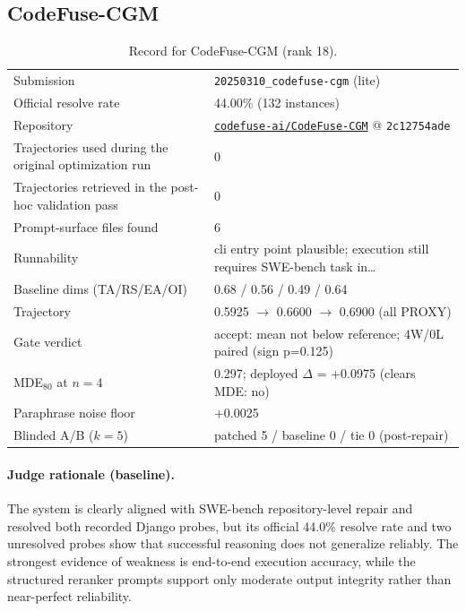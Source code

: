 \subsection{CodeFuse-CGM}
\label{app:agent18}
\begin{table}[H]\centering\scriptsize
\caption{Record for CodeFuse-CGM (rank 18).}
\begin{tabular}{lp{8.2cm}}\toprule
Submission & \texttt{20250310\_\allowbreak{}codefuse-cgm} (lite) \\
Official resolve rate & 44.00\% (132 instances) \\
Repository & \href{https://github.com/codefuse-ai/CodeFuse-CGM}{\texttt{codefuse-ai/CodeFuse-CGM}} @ \texttt{2c12754ade} \\
Trajectories used during the original optimization run & 0 \\
Trajectories retrieved in the post-hoc validation pass & 0 \\
Prompt-surface files found & 6 \\
Runnability & cli entry point plausible; execution still requires SWE-bench task in\ldots{} \\
Baseline dims (TA/RS/EA/OI) & 0.68 / 0.56 / 0.49 / 0.64 \\
Trajectory & 0.5925 $\to$ 0.6600 $\to$ 0.6900 (all PROXY) \\
Gate verdict & accept: mean not below reference; 4W/0L paired (sign p=0.125) \\
MDE$_{80}$ at $n{=}4$ & 0.297; deployed $\Delta$ = +0.0975 (clears MDE: no) \\
Paraphrase noise floor & +0.0025 \\
Blinded A/B ($k{=}5$) & patched 5 / baseline 0 / tie 0 (post-repair) \\
\bottomrule\end{tabular}\end{table}
\paragraph{Judge rationale (baseline).}
The system is clearly aligned with SWE-bench repository-level repair and resolved both recorded Django probes, but its official 44.0\% resolve rate and two unresolved probes show that successful reasoning does not generalize reliably. The strongest evidence of weakness is end-to-end execution accuracy, while the structured reranker prompts support only moderate output integrity rather than near-perfect reliability.
